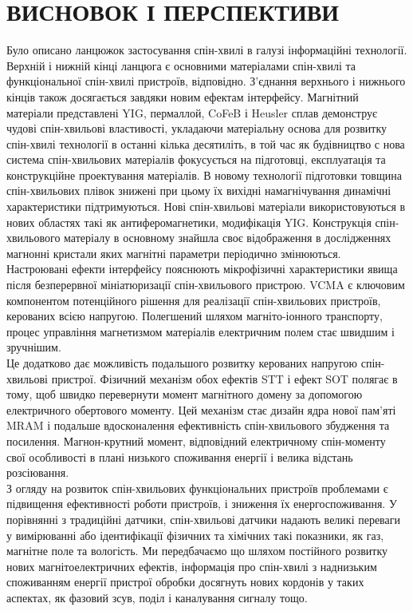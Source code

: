 \documentclass[a4paper,14pt]{extreport}
\begin{document}
\chapter{ВИСНОВОК І ПЕРСПЕКТИВИ}
Було описано  ланцюжок застосування спін-хвилі в галузі
інформаційні технології. Верхній і нижній кінці ланцюга
є основними матеріалами спін-хвилі та функціональної спін-хвилі
пристроїв, відповідно. З'єднання верхнього і нижнього кінців також
досягається завдяки новим ефектам інтерфейсу. Магнітний
матеріали представлені YIG, пермаллой, CoFeB і Heusler
сплав демонструє чудові спін-хвильові властивості, укладаючи 
матеріальну основа для розвитку спін-хвилі
технології в останні кілька десятиліть, в той час як будівництво с
нова система спін-хвильових матеріалів фокусується на підготовці,
експлуатація та конструкційне проектування матеріалів. В новому
технології підготовки товщина спін-хвильових плівок
знижені при цьому їх вихідні намагнічування динамічні характеристики
підтримуються. Нові спін-хвильові матеріали використовуються в нових областях
такі як антиферомагнетики, модифікація YIG. Конструкція спін-хвильового матеріалу 
в основному знайшла своє відображення в дослідженнях магнонні кристали яких
магнітні параметри періодично змінюються.\\ 

Настроювані ефекти інтерфейсу пояснюють мікрофізичні характеристики
явища після безперервної мініатюризації спін-хвильового пристрою. VCMA є ключовим компонентом потенційного рішення
для реалізації спін-хвильових пристроїв, керованих всією напругою. Полегшений
шляхом магніто-іонного транспорту, процес управління магнетизмом
матеріалів електричним полем стає швидшим і зручнішим.\\ 

Це додатково дає можливість подальшого розвитку керованих напругою
спін-хвильові пристрої. Фізичний механізм обох ефектів STT
і ефект SOT полягає в тому, щоб швидко перевернути момент магнітного домену
за допомогою електричного обертового моменту. Цей механізм стає
дизайн ядра нової пам'яті MRAM і подальше вдосконалення
ефективність спін-хвильового збудження та посилення.
Магнон-крутний момент, відповідний електричному спін-моменту
свої особливості в плані низького споживання енергії і
велика відстань розсіювання.\\


З огляду на розвиток спін-хвильових функціональних пристроїв
проблемами є підвищення ефективності роботи пристроїв, і
зниження їх енергоспоживання. У порівнянні з
традиційні датчики, спін-хвильові датчики надають великі переваги
у вимірюванні або ідентифікації фізичних та хімічних
такі показники, як газ, магнітне поле та вологість. Ми передбачаємо
що шляхом постійного розвитку нових магнітоелектричних ефектів,
інформація про спін-хвилі з наднизьким споживанням енергії
пристрої обробки досягнуть нових кордонів у таких аспектах, як
фазовий зсув, поділ і каналування сигналу тощо.\\
\end{document}
